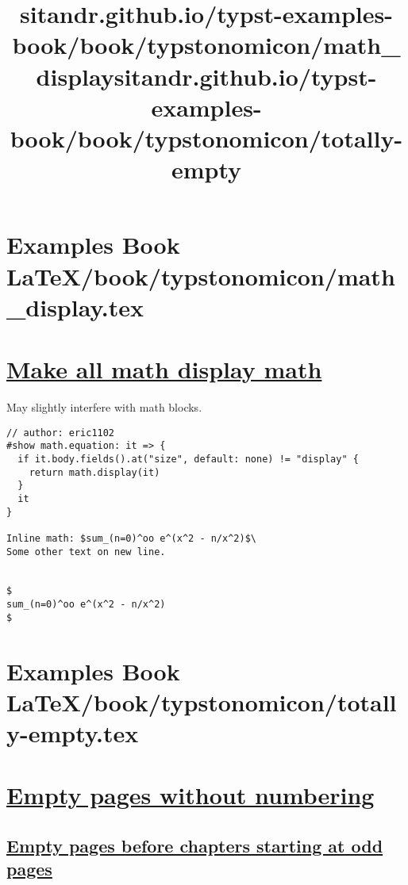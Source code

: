 \pandocbounded{}


\section{Examples Book LaTeX/book/typstonomicon/math_display.tex}
\title{sitandr.github.io/typst-examples-book/book/typstonomicon/math_display}

\section{\texorpdfstring{\hyperref[make-all-math-display-math]{Make all
math display
math}}{Make all math display math}}\label{make-all-math-display-math}

May slightly interfere with math blocks.

\begin{verbatim}
// author: eric1102
#show math.equation: it => {
  if it.body.fields().at("size", default: none) != "display" {
    return math.display(it)
  }
  it
}

Inline math: $sum_(n=0)^oo e^(x^2 - n/x^2)$\
Some other text on new line.


$
sum_(n=0)^oo e^(x^2 - n/x^2)
$
\end{verbatim}

\pandocbounded{}


\section{Examples Book LaTeX/book/typstonomicon/totally-empty.tex}
\title{sitandr.github.io/typst-examples-book/book/typstonomicon/totally-empty}

\section{\texorpdfstring{\hyperref[empty-pages-without-numbering]{Empty
pages without
numbering}}{Empty pages without numbering}}\label{empty-pages-without-numbering}

\subsection{\texorpdfstring{\hyperref[empty-pages-before-chapters-starting-at-odd-pages]{Empty
pages before chapters starting at odd
pages}}{Empty pages before chapters starting at odd pages}}\label{empty-pages-before-chapters-starting-at-odd-pages}

